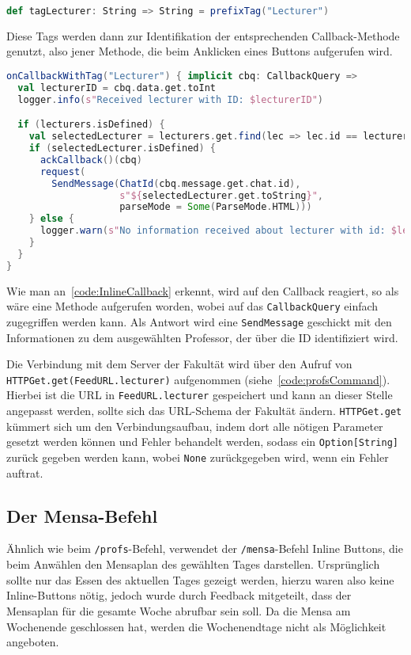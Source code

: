 \begin{lstlisting}[language=scala, style=scala, caption=Benutzung von Tags zur Identifikation von Callback-Methoden]
def tagLecturer: String => String = prefixTag("Lecturer")
\end{lstlisting}

Diese Tags werden dann zur Identifikation der entsprechenden Callback-Methode genutzt, also jener Methode, die beim Anklicken eines Buttons aufgerufen wird.

\begin{lstlisting}[language=scala, style=scala, caption=Callback-Funktionalität bei Inline-Buttons, label=code:InlineCallback]
onCallbackWithTag("Lecturer") { implicit cbq: CallbackQuery =>
  val lecturerID = cbq.data.get.toInt
  logger.info(s"Received lecturer with ID: $lecturerID")

  if (lecturers.isDefined) {
    val selectedLecturer = lecturers.get.find(lec => lec.id == lecturerID)
    if (selectedLecturer.isDefined) {
      ackCallback()(cbq)
      request(
        SendMessage(ChatId(cbq.message.get.chat.id),
                    s"${selectedLecturer.get.toString}",
                    parseMode = Some(ParseMode.HTML)))
    } else {
      logger.warn(s"No information received about lecturer with id: $lecturerID")
    }
  }
}
\end{lstlisting}

Wie man an~\autoref{code:InlineCallback} erkennt, wird auf den Callback reagiert, so als wäre eine Methode aufgerufen worden, wobei auf das \texttt{CallbackQuery} einfach zugegriffen werden kann. Als Antwort wird eine \texttt{SendMessage} geschickt mit den Informationen zu dem ausgewählten Professor, der über die ID identifiziert wird.

Die Verbindung mit dem Server der Fakultät wird über den Aufruf von \texttt{HTTPGet\allowbreak.get(\allowbreak FeedURL\allowbreak.lecturer)} aufgenommen (siehe~\autoref{code:profsCommand}). Hierbei ist die URL in \texttt{FeedURL\allowbreak.lecturer} gespeichert und kann an dieser Stelle angepasst werden, sollte sich das URL-Schema der Fakultät ändern. \texttt{HTTPGet.get} kümmert sich um den Verbindungsaufbau, indem dort alle nötigen Parameter gesetzt werden können und Fehler behandelt werden, sodass ein \texttt{Option[String]} zurück gegeben werden kann, wobei \texttt{None} zurückgegeben wird, wenn ein Fehler auftrat.

\subsection{Der Mensa-Befehl}
Ähnlich wie beim \texttt{/profs}-Befehl, verwendet der \texttt{/mensa}-Befehl Inline Buttons, die beim Anwählen den Mensaplan des gewählten Tages darstellen. Ursprünglich sollte nur das Essen des aktuellen Tages gezeigt werden, hierzu waren also keine Inline-Buttons nötig, jedoch wurde durch Feedback mitgeteilt, dass der Mensaplan für die gesamte Woche abrufbar sein soll. Da die Mensa am Wochenende geschlossen hat, werden die Wochenendtage nicht als Möglichkeit angeboten.

